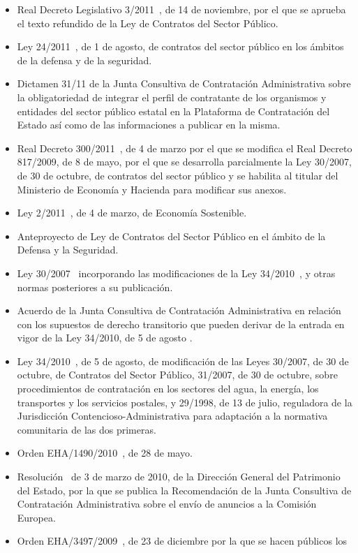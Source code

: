 \begin{itemize}
\item Real Decreto Legislativo 3/2011~\cite{rd3}, de 14 de noviembre, por el que se aprueba el texto refundido de la Ley de Contratos del Sector Público.
\item Ley 24/2011~\cite{l24}, de 1 de agosto, de contratos del sector público en los ámbitos de la defensa y de la seguridad.
\item Dictamen 31/11 de la Junta Consultiva de Contratación Administrativa sobre la obligatoriedad de integrar el perfil de contratante de los organismos y entidades del sector público estatal en la Plataforma de Contratación del Estado así como de las informaciones a publicar en la misma. 
\item Real Decreto 300/2011~\cite{r300}, de 4 de marzo por el que se modifica el Real Decreto 817/2009, de 8 de mayo, por el que se desarrolla parcialmente la Ley 30/2007, de 30 de octubre, de contratos del sector público y se habilita al titular del Ministerio de Economía y Hacienda para modificar sus anexos.
\item Ley 2/2011~\cite{l2}, de 4 de marzo, de Economía Sostenible.
\item Anteproyecto de Ley de Contratos del Sector Público en el ámbito de la Defensa y la Seguridad.
\item Ley 30/2007~\cite{l30} incorporando las modificaciones de la Ley 34/2010~\cite{l34}, y otras normas posteriores a su publicación.
\item Acuerdo de la Junta Consultiva de Contratación Administrativa en relación con los supuestos de derecho transitorio que pueden derivar de la entrada en vigor de la Ley 34/2010, de 5 de agosto .
\item Ley 34/2010~\cite{l34}, de 5 de agosto, de modificación de las Leyes 30/2007, de 30 de octubre, de Contratos del Sector Público, 31/2007, de 30 de octubre, sobre procedimientos de contratación en los sectores del agua, la energía, los transportes y los servicios postales, y 29/1998, de 13 de julio, reguladora de la Jurisdicción Contencioso-Administrativa para adaptación a la normativa comunitaria de las dos primeras.
\item Orden EHA/1490/2010~\cite{o1490}, de 28 de mayo.
\item Resolución~\cite{r3} de 3 de marzo de 2010, de la Dirección General del Patrimonio del Estado, por la que se 
publica la Recomendación de la Junta Consultiva de Contratación Administrativa sobre el envío de anuncios a la Comisión Europea. 
\item Orden EHA/3497/2009~\cite{oEHA}, de 23 de diciembre por la que se hacen públicos los

\end{itemize}
